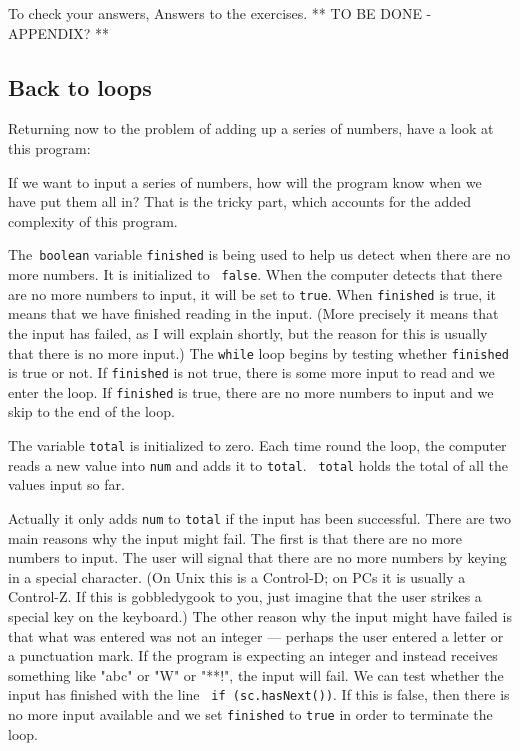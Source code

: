 To check your answers, Answers to the exercises. ** TO BE DONE - APPENDIX? **

\subsection{Back to loops}

Returning now to the problem of adding up a series of numbers, have a look at this program:


If we want to input a series of numbers, how will the program know when we have
put them all in?  That is the tricky part, which
accounts for the added complexity of this program.

The\texttt{ boolean} variable
\texttt{finished} is being used to help us detect when there are no more
numbers.  It is initialized to \texttt{ false}.  When the computer detects
that there are no more numbers to input, it will be set to \texttt{true}.
When \texttt{finished} is true, it means that we have finished reading in
the input.  (More precisely it means that the input has failed, as I will
explain shortly, but the reason for this is usually that there is no more
input.)  The \texttt{while} loop begins by testing whether \texttt{finished}
is true or not.  If \texttt{finished} is not true, there is some more input
to read and we enter the loop.  If \texttt{finished} is true, there are
no more numbers to input and we skip to the end of the loop.

The variable \texttt{total} is initialized to zero.
Each time round the loop, the computer reads a new value into \texttt{num}
and adds it to \texttt{total}. \texttt{ total} holds the total of all the values
input so far.

Actually it only adds  \texttt{num} to \texttt{total} if the input has been
successful.  There are two main reasons why the input might fail.
The first is that there are no more numbers to input.
The user will signal that there are no more numbers by keying in a special
character.  (On Unix this is a Control-D; on PCs it is usually a Control-Z.
If this is gobbledygook to you, just imagine that the user strikes a special
key on the keyboard.)  The other reason why the input might have failed
is that what was entered was not an integer --- perhaps the user entered
a letter or a punctuation mark.  If the program is expecting an integer
and instead receives something like "abc" or "W" or "**!", the input will fail.
We can test whether the input has finished with the line \texttt{ if (sc.hasNext())}.
If this is false, then there is no more input available and we set \texttt{finished} to \texttt{true}
in order to terminate the loop.

